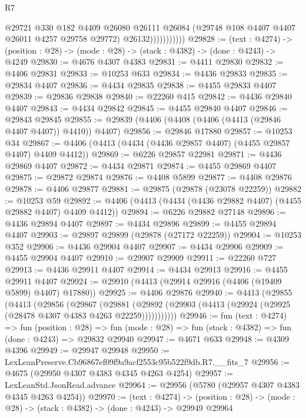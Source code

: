 \begin{lexlean}{R7}
\begin{coremodule}
                        @29721
                          @330
                          @182
                          @4409
                          @26080
                          @26111
                          @26084
                          (@29748 @108 @4407 @4407 @26011 @4257 @29758 @29772)
                          @26132)))))))))))
@29828 := (text : @4274) ->
  (position : @28) -> (mode : @28) -> (stack : @4382) -> (done : @4243) -> @4249
@29830 := @4676 @4307 @4383
@29831 := @4411 @29830
@29832 := @4406 @29831
@29833 := @10253 @633
@29834 := @4436 @29833
@29835 := @29834 @4407
@29836 := @4434 @29835
@29838 := @4455 @29833 @4407
@29839 := @29836 @29838
@29840 := @22260 @415
@29842 := @4436 @29840 @4407
@29843 := @4434 @29842
@29845 := @4455 @29840 @4407
@29846 := @29843 @29845
@29855 := @29839 (@4406 (@4408 (@4406 (@4413 (@29846 @4407 @4407)) @4410)) @4407)
@29856 := @29846 @17880
@29857 := @10253 @34
@29867 := @4406 (@4413 (@4434 (@4436 @29857 @4407) (@4455 @29857 @4407) @4409 @4412))
@29869 := @6226 @29857 @22981
@29871 := @4436 @29869 @4407
@29872 := @4434 @29871
@29874 := @4455 @29869 @4407
@29875 := @29872 @29874
@29876 := @4408 @5899
@29877 := @4408 @29876
@29878 := @4406 @29877
@29881 := @29875 (@29878 (@23078 @22259))
@29882 := @10253 @59
@29892 := @4406 (@4413 (@4434 (@4436 @29882 @4407) (@4455 @29882 @4407) @4409 @4412))
@29894 := @6226 @29882 @27148
@29896 := @4436 @29894 @4407
@29897 := @4434 @29896
@29899 := @4455 @29894 @4407
@29903 := @29897 @29899 (@29878 (@27172 @22259))
@29904 := @10253 @352
@29906 := @4436 @29904 @4407
@29907 := @4434 @29906
@29909 := @4455 @29904 @4407
@29910 := @29907 @29909
@29911 := @22260 @727
@29913 := @4436 @29911 @4407
@29914 := @4434 @29913
@29916 := @4455 @29911 @4407
@29924 := @29910 (@4413 (@29914 @29916 (@4406 (@19409 @5899) @4407) @17880))
@29925 := @4406 @29876
@29940 := @4413
    (@29855
      (@4413
        (@29856
          (@29867
            (@29881
              (@29892 (@29903 (@4413 (@29924 (@29925 (@28478 @4307 @4383 @4263 @22259)))))))))))
@29946 := fun (text : @4274) =>
  fun (position : @28) =>
  fun (mode : @28) => fun (stack : @4382) => fun (done : @4243) => @29832 @29940
@29947 := @4671 @633
@29948 := @4309 @4396
@29949 := @29947 @29948
@29950 := LexLeanPreserve.Cb96867ef09f9a9acf2553c95b522f9db.R7.__fits_7
@29956 := @4675 (@29950 @4307 @4383 @4345 @4263 @4254)
@29957 := LexLeanStd.JsonRead.advance
@29964 := @29956 (@5780 (@29957 @4307 @4383 @4345 @4263 @4254))
@29970 := (text : @4274) ->
  (position : @28) -> (mode : @28) -> (stack : @4382) -> (done : @4243) -> @29949 @29964

\end{coremodule}
\end{lexlean}
